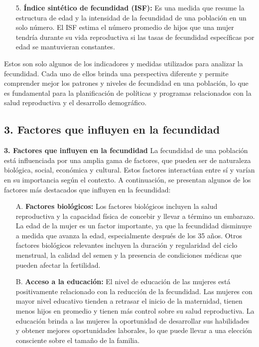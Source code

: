 \documentclass[8pt,a4paper]{beamer}
\begin{document}
{\begin{frame}{}
\begin{block}{}
\begin{enumerate}
\item[5.] \textbf{Índice sintético de fecundidad (ISF):} Es una medida que resume la estructura de edad y la intensidad de la fecundidad de una población en un solo número. El ISF estima el número promedio de hijos que una mujer tendría durante su vida reproductiva si las tasas de fecundidad específicas por edad se mantuvieran constantes.
\end{enumerate}
Estos son solo algunos de los indicadores y medidas utilizados para analizar la fecundidad. Cada uno de ellos brinda una perspectiva diferente y permite comprender mejor los patrones y niveles de fecundidad en una población, lo que es fundamental para la planificación de políticas y programas relacionados con la salud reproductiva y el desarrollo demográfico.
\end{block}
\end{frame}


\subsection{3. Factores que influyen en la fecundidad}
\begin{frame}{\textbf{3. Factores que influyen en la fecundidad}}
\setlength{\parskip}{3px}
\justifying
La fecundidad de una población está influenciada por una amplia gama de factores, que pueden ser de naturaleza biológica, social, económica y cultural. Estos factores interactúan entre sí y varían en su importancia según el contexto. A continuación, se presentan algunos de los factores más destacados que influyen en la fecundidad:
\begin{enumerate}
\setlength{\parskip}{3px}
\justifying
\item[A.] \textbf{Factores biológicos:} Los factores biológicos incluyen la salud reproductiva y la capacidad física de concebir y llevar a término un embarazo. La edad de la mujer es un factor importante, ya que la fecundidad disminuye a medida que avanza la edad, especialmente después de los 35 años. Otros factores biológicos relevantes incluyen la duración y regularidad del ciclo menstrual, la calidad del semen y la presencia de condiciones médicas que pueden afectar la fertilidad.

\item[B.] \textbf{Acceso a la educación:} El nivel de educación de las mujeres está positivamente relacionado con la reducción de la fecundidad. Las mujeres con mayor nivel educativo tienden a retrasar el inicio de la maternidad, tienen menos hijos en promedio y tienen más control sobre su salud reproductiva. La educación brinda a las mujeres la oportunidad de desarrollar sus habilidades y obtener mejores oportunidades laborales, lo que puede llevar a una elección consciente sobre el tamaño de la familia.
\end{enumerate}
\end{frame}

}
\end{document}
